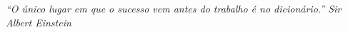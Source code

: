 \begin{titlepage}

\vspace*{\fill}

\hfill
\begin{minipage}{0.5\linewidth}
\begin{flushright}
\large\it
``O único lugar em que o sucesso vem antes do trabalho é no
dicionário.''\linebreak
\small
Sir Albert Einstein
\end{flushright}
\end{minipage}

\end{titlepage}
